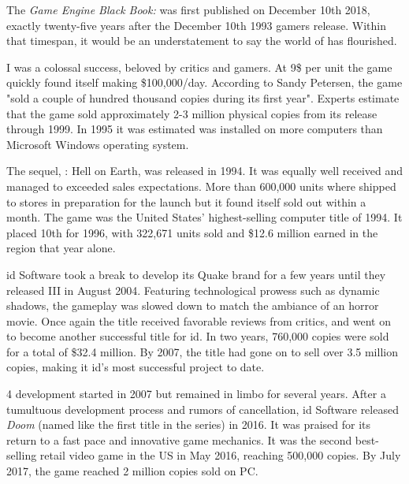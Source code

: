 The \textit{Game Engine Black Book: \doom{}} was first published on December 10th 2018, exactly twenty-five years after the December 10th 1993 gamers release. Within that timespan, it would be an understatement to say the world of \doom{} has flourished.\\
\par
\doom{} I was a colossal success, beloved by critics and gamers. At 9\$ per unit the game quickly found itself making \$100,000/day. According to Sandy Petersen, the game "sold a couple of hundred thousand copies during its first year". Experts estimate that the game sold approximately 2-3 million physical copies from its release through 1999. In 1995 it was estimated \doom{} was installed on more computers than Microsoft Windows operating system.\\
\par
The sequel, \doomii{}: Hell on Earth, was released in 1994. It was equally well received and managed to exceeded sales expectations. More than 600,000 units where shipped to stores in preparation for the launch but it found itself sold out within a month. The game was the United States' highest-selling computer title of 1994. It placed 10th for 1996, with 322,671 units sold and \$12.6 million earned in the region that year alone.\\
\par
id Software took a break to develop its Quake brand for a few years until they released \doom{} III in August 2004. Featuring technological prowess such as dynamic shadows, the gameplay was slowed down to match the ambiance of an horror movie. Once again the title received favorable reviews from critics, and went on to become another successful title for id. In two years, 760,000 copies were sold for a total of \$32.4 million.  By 2007, the title had gone on to sell over 3.5 million copies, making it id's most successful project to date.\\
\par
 \doom{} 4 development started in 2007 but remained in limbo for several years. After a tumultuous development process and rumors of cancellation, id Software released \textit{Doom} (named like the first title in the series) in 2016. It was praised for its return to a fast pace and innovative game mechanics. It was the second best-selling retail video game in the US in May 2016, reaching 500,000 copies. By July 2017, the game reached 2 million copies sold on PC.\\
\par

